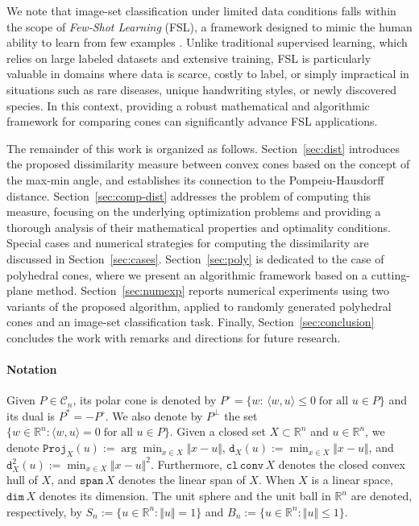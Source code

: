 \documentclass[hidelinks,onefignum,onetabnum]{siamart250211}
\theoremstyle{definition}
\theoremstyle{remark}
\newcommand{\R}{\mathbb R}
\newcommand{\CC}{\mathcal C}
\newcommand{\inner}[2]{\langle#1,#2\rangle}
\newcommand{\norm}[1]{\textstyle{\Vert} #1 \textstyle{\Vert}}
\newcommand{\dist}{\mathtt{d}}
\newcommand{\proj}{\mathtt{Proj}}
\begin{document}
We note that image-set classification under limited data conditions falls within the scope of \emph{Few-Shot Learning} (FSL), a framework designed to mimic the human ability to learn from few examples \cite{FSL}. Unlike traditional supervised learning, which relies on large labeled datasets and extensive training, FSL is particularly valuable in domains where data is scarce, costly to label, or simply impractical in situations such as rare diseases, unique handwriting styles, or newly discovered species. In this context, providing a robust mathematical and algorithmic framework for comparing cones can significantly advance FSL applications.


The remainder of this work is organized as follows. Section~\ref{sec:dist} introduces the proposed dissimilarity measure between convex cones based on the concept of the max-min angle, and establishes its connection to the Pompeiu-Hausdorff distance. Section~\ref{sec:comp-dist} addresses the problem of computing this measure, focusing on the underlying optimization problems and providing a thorough analysis of their mathematical properties and optimality conditions. Special cases and numerical strategies for computing the dissimilarity are discussed in Section~\ref{sec:cases}. Section~\ref{sec:poly} is dedicated to the case of polyhedral cones, where we present an algorithmic framework based on a cutting-plane method. Section~\ref{sec:numexp} reports numerical experiments using two variants of the proposed algorithm, applied to randomly generated polyhedral cones and an image-set classification task. Finally, Section~\ref{sec:conclusion} concludes the work with remarks and directions for future research.





\paragraph{Notation} Given $P \in \CC_n$, its polar cone is denoted by $P^\circ=\{w:\, \inner{w}{u}\leq 0\; \mbox{for all } u \in P\}$ and its dual is $P^* = -P^\circ$. We also denote by $P^\perp$ the set $\{w\in \R^n: \inner{w}{u}=0\; \mbox{for all } u \in P\}$. Given a closed set $X \subset \R^n$ and $u \in \R^n$, we denote  $\proj_{X}(u):=\arg\min _{x \in X} \norm{x-u}$, $\dist_{X}(u):=\min _{x \in X} \norm{x-u}$, and $\dist^2_{X}(u):=\min _{x \in X} \norm{x-u}^2$. Furthermore, $\mathtt{cl\, conv}\,X$ denotes the closed convex hull of $X$, and $\mathtt{span}\,X$ denotes the linear span of $X$. When $X$ is a linear space, $\mathtt{dim}\,X$ denotes its dimension. The unit sphere and the unit ball in $\R^n$ are denoted, respectively, by $S_n:=\{u\in\R^n:\Vert u\Vert= 1\}$ and $B_n:=\{u\in\R^n:\Vert u\Vert\leq 1\}$.
\end{document}
